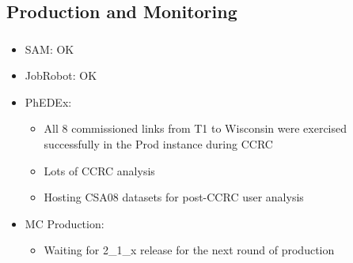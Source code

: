 \documentclass{beamer}
\begin{document}
\subsection{Production and Monitoring}
\begin{frame}
\frametitle{}
\begin{itemize}
    \item SAM: OK
    \item JobRobot: OK 
    \item PhEDEx:
    \begin{itemize}
        \item All 8 commissioned links from T1 to Wisconsin were exercised successfully in the Prod instance during CCRC
        \item Lots of CCRC analysis
        \item Hosting CSA08 datasets for post-CCRC user analysis
    \end{itemize}
    \item MC Production:
    \begin{itemize}
        \item Waiting for 2\_1\_x release for the next round of production
    \end{itemize}
\end{itemize}
\end{frame}
\end{document}

